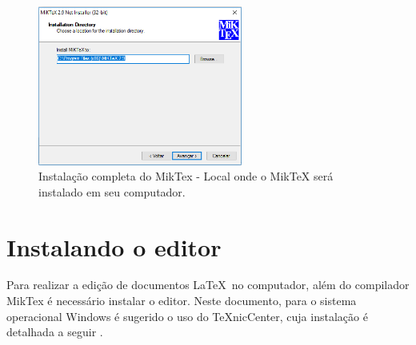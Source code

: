 \begin{enumerate}
\begin{figure}[H]
  \centering
  \includegraphics[width=0.6\textwidth]{./fig/miktex20}
  \caption{Instalação completa do MikTex - Local onde o MikTeX será instalado em seu computador.}
\end{figure}
\end{enumerate}

\section{Instalando o editor}

Para realizar a edição de documentos \LaTeX\ no computador, além do compilador MikTex é necessário instalar o editor. Neste documento, para o sistema operacional Windows é sugerido o uso do TeXnicCenter, cuja instalação é detalhada a seguir \cite{texnic}.

